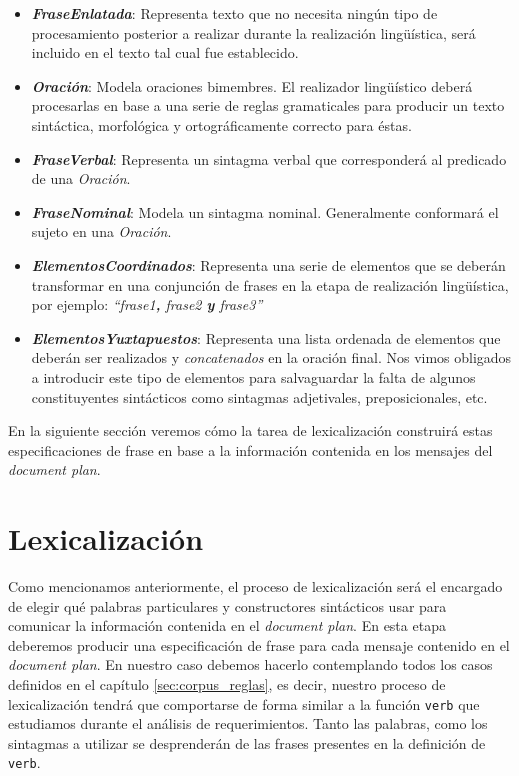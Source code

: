 \medskip
\begin{itemize}
\item{\emph{\textbf{FraseEnlatada}}: Representa texto que no necesita ningún tipo de procesamiento posterior a realizar durante la realización lingüística, será incluido en el texto tal cual fue establecido.}
\item{\emph{\textbf{Oración}}: Modela oraciones bimembres. El realizador lingüístico deberá procesarlas en base a una serie de reglas gramaticales para producir un texto sintáctica, morfológica y ortográficamente correcto para éstas.}
\item{\emph{\textbf{FraseVerbal}}: Representa un sintagma verbal que corresponderá al predicado de una \emph{Oración}.}
\item{\emph{\textbf{FraseNominal}}: Modela un sintagma nominal. Generalmente conformará el sujeto en una \emph{Oración}.}
\item{\emph{\textbf{ElementosCoordinados}}: Representa una serie de elementos que se deberán transformar en una conjunción de frases en la etapa de realización lingüística, por ejemplo: \emph{``frase1\textbf{,} frase2 \textbf{y} frase3''}}
\item{\emph{\textbf{ElementosYuxtapuestos}}: Representa una lista ordenada de elementos que deberán ser realizados y \emph{concatenados} en la oración final. Nos vimos obligados a introducir este tipo de elementos para salvaguardar la falta de algunos constituyentes sintácticos como sintagmas adjetivales, preposicionales, etc.}
\end{itemize}

En la siguiente sección veremos cómo la tarea de lexicalización construirá estas especificaciones de frase en base a la información contenida en los mensajes del \textit{document plan}.

\section{Lexicalización}
\label{sec:microplanning_lexicalization}

Como mencionamos anteriormente, el proceso de lexicalización será el encargado de elegir qué palabras particulares y constructores sintácticos usar para comunicar la información contenida en el \textit{document plan}. En esta etapa deberemos producir una especificación de frase para cada mensaje contenido en el \textit{document plan}. En nuestro caso debemos hacerlo contemplando todos los casos definidos en el capítulo \ref{sec:corpus_reglas}, es decir, nuestro proceso de lexicalización tendrá que comportarse de forma similar a la función \texttt{verb} que estudiamos durante el análisis de requerimientos. Tanto las palabras, como los sintagmas a utilizar se desprenderán de las frases presentes en la definición de \texttt{verb}.

